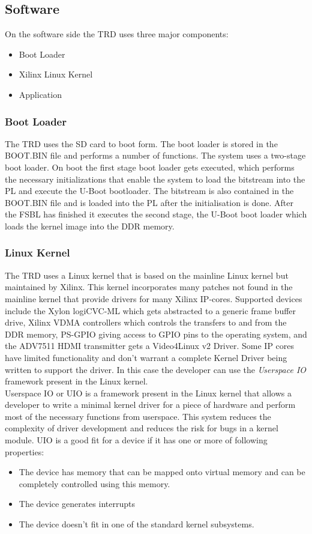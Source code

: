 \subsection{Software}
On the software side the TRD uses three major components:
\begin{itemize}
	\item Boot Loader
	\item Xilinx Linux Kernel
	\item Application
\end{itemize}

\subsubsection{Boot Loader} The TRD uses the SD card to boot form. The boot loader is stored in the BOOT.BIN file and performs a number of functions. The system uses a two-stage boot loader. On boot the first stage boot loader gets executed, which performs the necessary initializations that enable the system to load the bitstream into the PL and execute the U-Boot bootloader. The bitstream is also contained in the BOOT.BIN file and is loaded into the PL after the initialisation is done. After the FSBL has finished it executes the second stage, the U-Boot boot loader which loads the kernel image into the DDR memory.

\subsubsection{Linux Kernel}
The TRD uses a Linux kernel that is based on the mainline Linux kernel but maintained by Xilinx. This kernel incorporates many patches not found in the mainline kernel that provide drivers for many Xilinx IP-cores. Supported devices include the Xylon logiCVC-ML which gets abstracted to a generic frame buffer drive, Xilinx VDMA controllers which controls the transfers to and from the DDR memory, PS-GPIO giving access to GPIO pins to the operating system, and the ADV7511 HDMI transmitter gets a Video4Linux v2 Driver. Some IP cores have limited functionality and don't warrant a complete Kernel Driver being written to support the driver. In this case the developer can use the \emph{Userspace IO} framework present in the Linux kernel.\\
Userspace IO or UIO is a framework present in the Linux kernel that allows a developer to write a minimal kernel driver for a piece of hardware and perform most of the necessary functions from userspace. This system reduces the complexity of driver development and reduces the risk for bugs in a kernel module. UIO is a good fit for a device if it has one or more of following properties:
\begin{itemize}
	\item The device has memory that can be mapped onto virtual memory and can be completely controlled using this memory.
	\item The device generates interrupts
	\item The device doesn't fit in one of the standard kernel subsystems.
\end{itemize}

